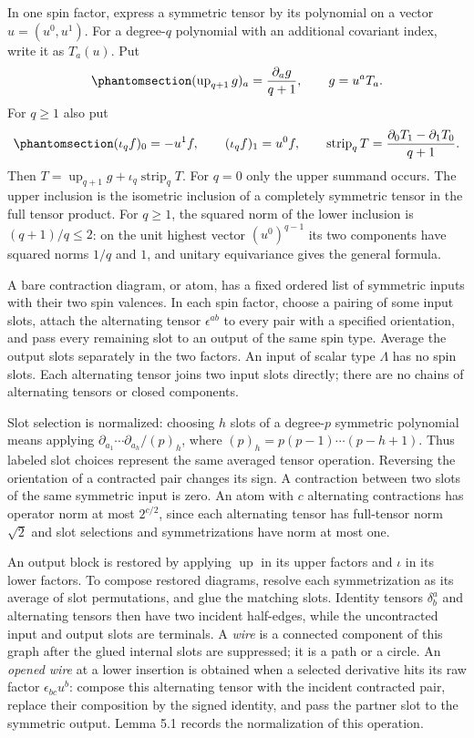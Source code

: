 \documentclass[
  english,
  11pt,
  reqno]{amsart}
\begin{document}
In one spin factor, express a symmetric tensor by its polynomial on a
vector \(u=(u^0,u^1)\). For a degree-\(q\) polynomial with an additional
covariant index, write it as \(T_a(u)\). Put
\begin{equation}\protect\phantomsection\label{eq:es-upper-inclusion}{
 (\operatorname{up}_{q+1}g)_a=\frac{\partial_ag}{q+1},\qquad
 g=u^aT_a.
}\end{equation} For \(q\ge1\) also put
\begin{equation}\protect\phantomsection\label{eq:es-lower-inclusion}{
 (\iota_qf)_0=-u^1f,\qquad
 (\iota_qf)_1=u^0f,\qquad
 \operatorname{strip}_qT
 =\frac{\partial_0T_1-\partial_1T_0}{q+1}.
}\end{equation} Then
\(T=\operatorname{up}_{q+1}g+\iota_q\operatorname{strip}_qT\). For
\(q=0\) only the upper summand occurs. The upper inclusion is the
isometric inclusion of a completely symmetric tensor in the full tensor
product. For \(q\ge1\), the squared norm of the lower inclusion is
\((q+1)/q\le2\): on the unit highest vector \((u^0)^{q-1}\) its two
components have squared norms \(1/q\) and \(1\), and unitary
equivariance gives the general formula.

A bare contraction diagram, or atom, has a fixed ordered list of
symmetric inputs with their two spin valences. In each spin factor,
choose a pairing of some input slots, attach the alternating tensor
\(\epsilon^{ab}\) to every pair with a specified orientation, and pass
every remaining slot to an output of the same spin type. Average the
output slots separately in the two factors. An input of scalar type
\(\Lambda\) has no spin slots. Each alternating tensor joins two input
slots directly; there are no chains of alternating tensors or closed
components.

Slot selection is normalized: choosing \(h\) slots of a degree-\(p\)
symmetric polynomial means applying
\(\partial_{a_1}\cdots\partial_{a_h}/(p)_h\), where
\((p)_h=p(p-1)\cdots(p-h+1)\). Thus labeled slot choices represent the
same averaged tensor operation. Reversing the orientation of a
contracted pair changes its sign. A contraction between two slots of the
same symmetric input is zero. An atom with \(c\) alternating
contractions has operator norm at most \(2^{c/2}\), since each
alternating tensor has full-tensor norm \(\sqrt2\) and slot selections
and symmetrizations have norm at most one.

An output block is restored by applying \(\operatorname{up}\) in its
upper factors and \(\iota\) in its lower factors. To compose restored
diagrams, resolve each symmetrization as its average of slot
permutations, and glue the matching slots. Identity tensors
\(\delta^a_b\) and alternating tensors then have two incident
half-edges, while the uncontracted input and output slots are terminals.
A \emph{wire} is a connected component of this graph after the glued
internal slots are suppressed; it is a path or a circle. An \emph{opened
wire} at a lower insertion is obtained when a selected derivative hits
its raw factor \(\epsilon_{bc}u^b\): compose this alternating tensor
with the incident contracted pair, replace their composition by the
signed identity, and pass the partner slot to the symmetric output.
Lemma 5.1 records the normalization of this operation.
\end{document}
